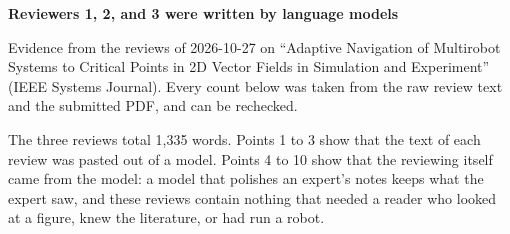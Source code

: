 \documentclass[11pt,letterpaper]{article}
\begin{document}
{\sffamily\bfseries\LARGE Reviewers 1, 2, and 3 were written by language models}\par
\vspace{2pt}
{\sffamily\small Evidence from the reviews of 2026-10-27 on ``Adaptive Navigation of Multirobot Systems to Critical Points in 2D Vector Fields in Simulation and Experiment'' (IEEE Systems Journal). Every count below was taken from the raw review text and the submitted PDF, and can be rechecked.}\par
\vspace{4pt}

The three reviews total 1,335 words. Points 1 to 3 show that the text of each review was pasted out of a model. Points 4 to 10 show that the reviewing itself came from the model: a model that polishes an expert's notes keeps what the expert saw, and these reviews contain nothing that needed a reader who looked at a figure, knew the literature, or had run a robot.
\end{document}
